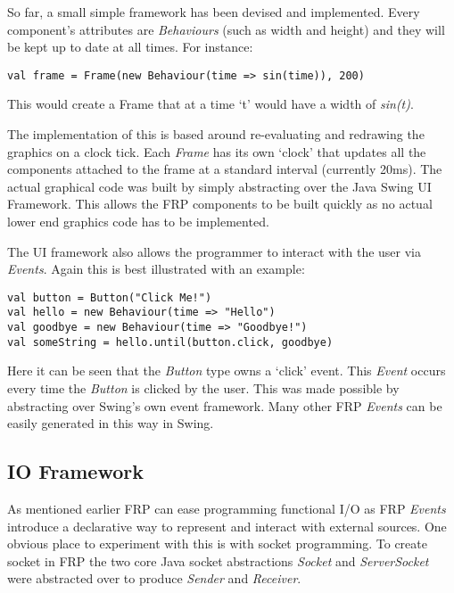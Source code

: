 \documentclass[12pt]{article}
\begin{document}
      So far, a small simple framework has been devised and implemented. Every component's attributes are \emph{Behaviours} 
      (such as width and height) and they will be kept up to date at all times. For instance:

\begin{verbatim}
val frame = Frame(new Behaviour(time => sin(time)), 200) 
\end{verbatim}

      This would create a Frame that at a time `t' would have a width of \emph{sin(t)}.

      The implementation of this is based around re-evaluating and redrawing the graphics on a clock tick. Each 
      \emph{Frame} has its own `clock' that updates all the components attached to the frame at a standard interval (currently 
      20ms). The actual graphical code was built by simply abstracting over the Java Swing UI Framework. This allows the FRP 
      components to be built quickly as no actual lower end graphics code has to be implemented.

      The UI framework also allows the programmer to interact with the user via \emph{Events}. Again this is best illustrated 
      with an example:

\begin{verbatim}
val button = Button("Click Me!") 
val hello = new Behaviour(time => "Hello")
val goodbye = new Behaviour(time => "Goodbye!")
val someString = hello.until(button.click, goodbye) 
\end{verbatim}

      Here it can be seen that the \emph{Button} type owns a `click' event. This \emph{Event} occurs every time the 
      \emph{Button} is clicked by the user. This was made possible by abstracting over Swing's own event framework. Many other 
      FRP \emph{Events} can be easily generated in this way in Swing.
    
    \subsection{IO Framework}
    
    As mentioned earlier FRP can ease programming functional I/O as FRP \emph{Events} introduce a declarative way to represent 
    and interact with external sources. One obvious place to experiment with this is with socket programming. To create socket 
    in FRP the two core Java socket abstractions \emph{Socket} and \emph{ServerSocket} were abstracted over to produce
    \emph{Sender} and \emph{Receiver}. 
\end{document}
